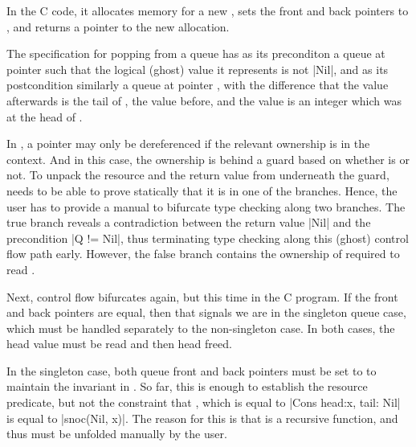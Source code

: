 In the C code, it allocates memory for a new , sets the
front and back pointers to , and returns a pointer to the new
allocation.


The specification for popping from a queue has as its preconditon a queue at
pointer  such that the logical (ghost) value  it
represents is not \cinline|Nil{}|, and as its postcondition similarly a queue
at pointer , with the difference that the value afterwards
 is the tail of , the value before, and the
 value is an integer which was at the head of .

In , a pointer may only be dereferenced if the relevant ownership is in
the context. And in this case, the ownership is behind a guard based on whether
 is  or not. To unpack the resource and the
return value from underneath the guard,  needs to be able to prove
statically that it is in one of the branches. Hence, the user has to provide a
manual  to bifurcate type checking along two branches. The
true branch reveals a contradiction between the return value \cinline|Nil{}|
and the precondition \cninline|Q != Nil{}|, thus terminating type %
checking along this (ghost) control flow path early. However, the false branch
contains the ownership of  required to read .

Next, control flow bifurcates again, but this time in the C program. If the
front and back pointers are equal, then that signals we are in the singleton
queue case, which must be handled separately to the non-singleton case. In both
cases, the head value must be read and then head 
freed.

In the singleton case, both queue front and back pointers must be set to
 to maintain the invariant in . So far,
this is enough to establish the resource predicate, but not the constraint that
, which is equal to \cninline[breaklines]|Cons {head:x, tail:
Nil{}}| is equal to \cninline|snoc(Nil{}, x)|. The reason for this %
is that  is a recursive function, and thus must be unfolded
manually by the user.


